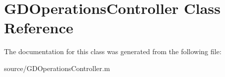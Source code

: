\hypertarget{class_g_d_operations_controller}{
\section{GDOperationsController Class Reference}
\label{class_g_d_operations_controller}
}


The documentation for this class was generated from the following file:\begin{DoxyCompactItemize}
\item 
source/GDOperationsController.m\end{DoxyCompactItemize}
